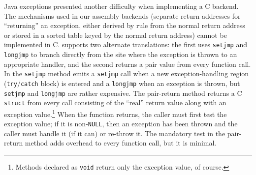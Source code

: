 Java exceptions presented another difficulty when implementing a C
backend.  The mechanisms used in our assembly backends (separate
return addresses for ``returning'' an exception, either derived by
rule from the normal return address or stored in a sorted table keyed
by the normal return address) cannot be implemented in C\@.  \Flex supports
two alternate translations: the first uses \texttt{setjmp} and
\texttt{longjmp} to branch directly from the site where the exception
is thrown to an appropriate handler, and the second returns a pair
value from every function call.  In the \texttt{setjmp} method \flex emits
a \texttt{setjmp} call when a new exception-handling region
(\texttt{try}/\texttt{catch} block) is entered and a \texttt{longjmp}
when an exception is thrown,
but \texttt{setjmp} and \texttt{longjmp} are rather
expensive.  The pair-return method returns a C \texttt{struct} from every
call consisting of the ``real'' return value along with an exception
value.\footnote{Methods declared as \texttt{void} return only the
  exception value, of course.}  When the function returns, the caller
must first test the exception value; if it is non-\texttt{NULL}, then
an exception has been thrown and the caller must handle it (if it can)
or re-throw it.
The mandatory test in the pair-return method adds overhead to every
function call, but it is minimal.  


